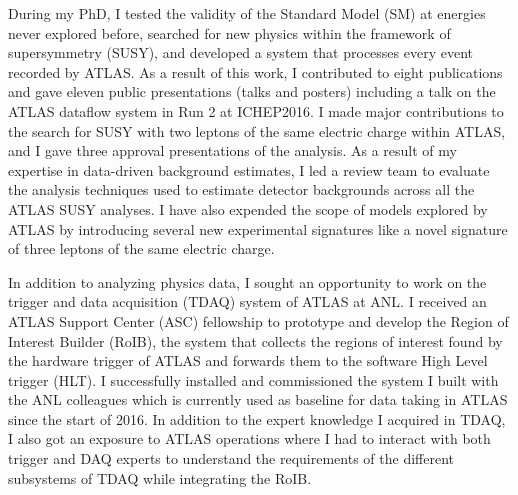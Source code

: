 \documentclass[a4paper]{article}
\begin{document}
During my PhD, I tested the validity of the Standard Model (SM) at energies never explored before, searched for new physics 
within the framework of supersymmetry (SUSY), and developed a system that processes every event recorded by ATLAS.
As a result of this work, I contributed to eight publications and gave eleven public presentations (talks and posters) 
including a talk on the ATLAS dataflow system in Run 2 at ICHEP2016.
I made major contributions to the search for SUSY with two leptons of the same electric charge 
within ATLAS, and I gave three approval presentations of the analysis. 
As a result of my expertise in data-driven background estimates, 
I led a review team to evaluate the analysis techniques used to estimate detector backgrounds across all the ATLAS SUSY analyses.
I have also expended the scope of models explored by ATLAS by introducing several new experimental 
signatures like a novel signature of three leptons of the same electric charge. 

In addition to analyzing physics data, I sought an opportunity to work on the trigger and data acquisition (TDAQ) system
of ATLAS at ANL. I received an ATLAS Support Center (ASC) fellowship to prototype and develop
the Region of Interest Builder (RoIB), the system that collects the regions of interest 
found by the hardware trigger of ATLAS and forwards them to the software High Level trigger (HLT).
I successfully installed and commissioned the system 
I built with the ANL colleagues which is currently used as baseline for data taking in ATLAS since the start of 2016.
In addition to the expert knowledge I acquired in TDAQ, I also got an exposure to ATLAS operations where I had 
to interact with both trigger and DAQ experts to understand the requirements of the different subsystems of TDAQ 
while integrating the RoIB.
\end{document}
